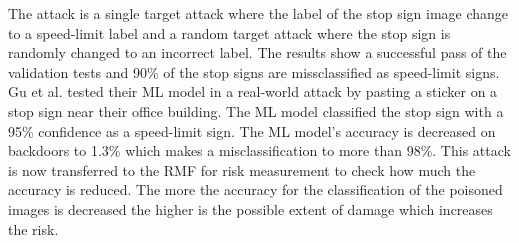 The attack is a single target attack where the label of the stop sign image change to a speed-limit label and a random target attack where the stop sign is randomly changed to an incorrect label. The results show a successful pass of the validation tests and 90\% of the stop signs are missclassified as speed-limit signs. Gu et al. tested their ML model in a real-world attack by pasting a sticker on a stop sign near their office building. The ML model classified the stop sign with a 95\% confidence as a speed-limit sign. The ML model's accuracy is decreased on backdoors to 1.3\% which makes a misclassification to more than 98\%. This attack is now transferred to the RMF for risk measurement to check how much the accuracy is reduced. The more the accuracy for the classification of the poisoned images is decreased the higher is the possible extent of damage which increases the risk. \\ \\
